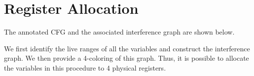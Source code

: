 \section{Register Allocation}

The annotated CFG and the associated interference graph are shown below. 

We first identify the live ranges of all the variables and construct the
interference graph. We then provide a 4-coloring of this graph.
Thus, it is possible to allocate the variables in this procedure to 4
physical registers.


